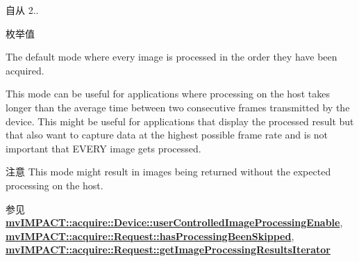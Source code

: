 \begin{DoxySince}{自从}
2.. 
\end{DoxySince}
\begin{Desc}
\item[枚举值]\par
\begin{description}
\item[{\em 
\hypertarget{group___common_interface_ggaee0074fce284fcdf9ead4ad607e85a06a1247c3b24698cfab3b12e6e4deb117cd}{ipm\+Default}\label{group___common_interface_ggaee0074fce284fcdf9ead4ad607e85a06a1247c3b24698cfab3b12e6e4deb117cd}
}]The default mode where every image is processed in the order they have been acquired. \item[{\em 
\hypertarget{group___common_interface_ggaee0074fce284fcdf9ead4ad607e85a06a9ba2cff7d616a7bb77aa739c2066c797}{ipm\+Process\+Latest\+Only}\label{group___common_interface_ggaee0074fce284fcdf9ead4ad607e85a06a9ba2cff7d616a7bb77aa739c2066c797}
}]This mode can be useful for applications where processing on the host takes longer than the average time between two consecutive frames transmitted by the device. This might be useful for applications that display the processed result but that also want to capture data at the highest possible frame rate and is not important that E\+V\+E\+R\+Y image gets processed.

\begin{DoxyAttention}{注意}
This mode might result in images being returned without the expected processing on the host.
\end{DoxyAttention}
\begin{DoxySeeAlso}{参见}
{\bfseries \hyperlink{classmv_i_m_p_a_c_t_1_1acquire_1_1_device_a4d5db996353c3b9ada5f6a15fb19f9eb}{mv\+I\+M\+P\+A\+C\+T\+::acquire\+::\+Device\+::user\+Controlled\+Image\+Processing\+Enable}}, ~\newline
 {\bfseries \hyperlink{classmv_i_m_p_a_c_t_1_1acquire_1_1_request_a523d15ab27c20de51f0c5ffd41ff3834}{mv\+I\+M\+P\+A\+C\+T\+::acquire\+::\+Request\+::has\+Processing\+Been\+Skipped}}, ~\newline
 {\bfseries \hyperlink{classmv_i_m_p_a_c_t_1_1acquire_1_1_request_a3df38a3b0375cea7fed2826b62163264}{mv\+I\+M\+P\+A\+C\+T\+::acquire\+::\+Request\+::get\+Image\+Processing\+Results\+Iterator}} 
\end{DoxySeeAlso}
\end{description}
\end{Desc}
